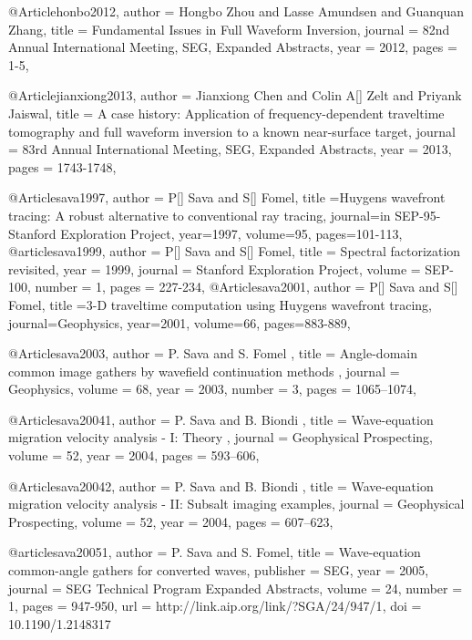 @Article{honbo2012,
  author = 	 {Hongbo Zhou and Lasse Amundsen and Guanquan Zhang},
  title = 	 {Fundamental Issues in Full Waveform Inversion},
  journal = 	 {82nd Annual International Meeting, SEG, Expanded Abstracts},
  year = 	 2012,
  pages =	 {1-5},
}

@Article{jianxiong2013,
  author = 	 {Jianxiong Chen and Colin A[] Zelt and Priyank Jaiswal},
  title = 	 {A case history: Application of frequency-dependent traveltime tomography and full waveform
inversion to a known near-surface target},
  journal = 	 {83rd Annual International Meeting, SEG, Expanded Abstracts},
  year = 	 2013,
  pages =	 {1743-1748},
}

@Article{sava1997,
  author = {P[] Sava and S[] Fomel},
  title ={Huygens wavefront tracing: A robust alternative to conventional ray tracing},
  journal={in SEP-95-Stanford Exploration Project},
  year=1997,
  volume=95,
  pages={101-113},
}
@article{sava1999,
  author =	 {P[] Sava and S[] Fomel},
  title =	 {Spectral factorization revisited},
  year =	 1999,
  journal =	 {Stanford Exploration Project},
  volume =	 SEP-100,
  number =	 1,
  pages =	 {227-234},
}
@Article{sava2001,
  author = {P[] Sava and S[] Fomel},
  title ={3-D traveltime computation using Huygens wavefront tracing},
  journal={Geophysics},
  year=2001,
  volume=66,
  pages={883-889},
}

@Article{sava2003,
  author =	 { P. Sava and S. Fomel },
  title =	 { Angle-domain common image gathers by wavefield
                  continuation methods },
  journal =	 {Geophysics},
  volume =	 68,
  year =	 2003,
  number =	 3,
  pages =	 {1065--1074},
}

@Article{sava20041,
 author =  { P. Sava and B. Biondi },
 title =   { Wave-equation migration velocity analysis - {I}: {Theory} },
 journal = {Geophysical Prospecting},
 volume = {52},
 year =   {2004},
 pages =  {593--606},
}

@Article{sava20042,
 author =  { P. Sava and B. Biondi },
 title =   { Wave-equation migration velocity analysis - {II}:
{Subsalt} imaging examples},
 journal = {Geophysical Prospecting},
 volume = {52},
 year =   {2004},
 pages =  {607--623},
}

@article{sava20051,
  author =	 {P. Sava and S. Fomel},
  title =	 {Wave-equation common-angle gathers for converted
                  waves},
  publisher =	 {SEG},
  year =	 2005,
  journal =	 {SEG Technical Program Expanded Abstracts},
  volume =	 24,
  number =	 1,
  pages =	 {947-950},
  url =		 {http://link.aip.org/link/?SGA/24/947/1},
  doi =		 {10.1190/1.2148317}
}

